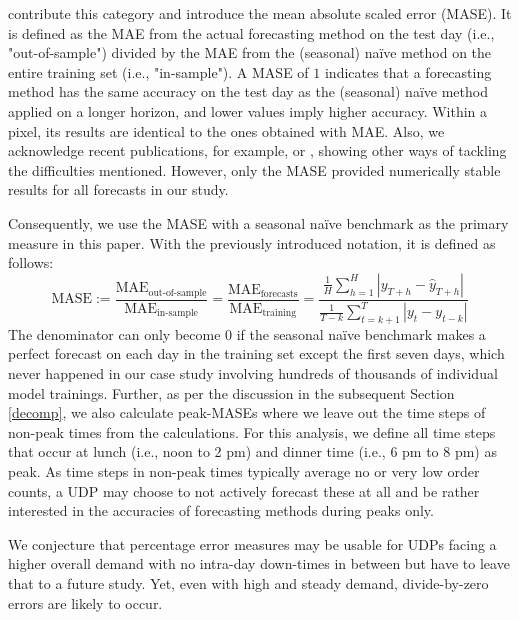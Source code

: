\begin{enumerate}
\cite{hyndman2006} contribute this category and introduce the mean absolute
    scaled error (MASE).
It is defined as the MAE from the actual forecasting method on the test day
    (i.e., "out-of-sample") divided by the MAE from the (seasonal) na\"{i}ve
    method on the entire training set (i.e., "in-sample").
A MASE of $1$ indicates that a forecasting method has the same accuracy
    on the test day as the (seasonal) na\"{i}ve method applied on a longer
    horizon, and lower values imply higher accuracy.
Within a pixel, its results are identical to the ones obtained with MAE.
Also, we acknowledge recent publications, for example, \cite{prestwich2014} or
    \cite{kim2016}, showing other ways of tackling the difficulties mentioned.
However, only the MASE provided numerically stable results for all
    forecasts in our study.
\end{enumerate}
Consequently, we use the MASE with a seasonal na\"{i}ve benchmark as the
    primary measure in this paper.
With the previously introduced notation, it is defined as follows:
$$
\text{MASE}
:=
\frac{\text{MAE}_{\text{out-of-sample}}}{\text{MAE}_{\text{in-sample}}}
=
\frac{\text{MAE}_{\text{forecasts}}}{\text{MAE}_{\text{training}}}
=
\frac{\frac{1}{H} \sum_{h=1}^H |y_{T+h} - \hat{y}_{T+h}|}
     {\frac{1}{T-k} \sum_{t=k+1}^T |y_{t} - y_{t-k}|}
$$
The denominator can only become $0$ if the seasonal na\"{i}ve benchmark makes
    a perfect forecast on each day in the training set except the first seven
    days, which never happened in our case study involving hundreds of
    thousands of individual model trainings.
Further, as per the discussion in the subsequent Section \ref{decomp}, we also
    calculate peak-MASEs where we leave out the time steps of non-peak times
    from the calculations.
For this analysis, we define all time steps that occur at lunch (i.e., noon to
    2 pm) and dinner time (i.e., 6 pm to 8 pm) as peak.
As time steps in non-peak times typically average no or very low order counts,
    a UDP may choose to not actively forecast these at all and be rather
    interested in the accuracies of forecasting methods during peaks only.

We conjecture that percentage error measures may be usable for UDPs facing a
    higher overall demand with no intra-day down-times in between but have to
    leave that to a future study.
Yet, even with high and steady demand, divide-by-zero errors are likely to
    occur.
